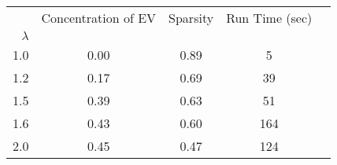 \begin{tabular}{r|cccc}
\toprule
{} &  Concentration of EV &  Sparsity & Run Time (sec) \\
$\lambda$ &                      &           &                \\
\midrule
1.0       &                 0.00 &      0.89 &              5 \\
1.2       &                 0.17 &      0.69 &             39 \\
1.5       &                 0.39 &      0.63 &             51 \\
1.6       &                 0.43 &      0.60 &            164 \\
2.0       &                 0.45 &      0.47 &            124 \\
\bottomrule
\end{tabular}
